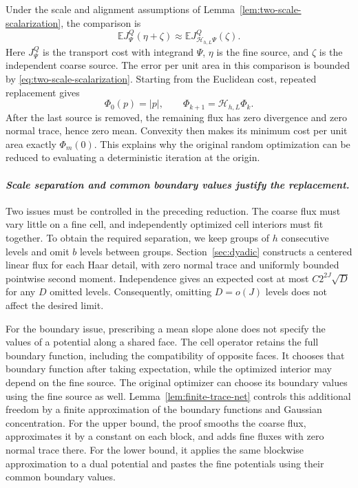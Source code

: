 \documentclass[11pt,reqno]{amsart}
\theoremstyle{plain}
\theoremstyle{definition}
\theoremstyle{remark}
\numberwithin{equation}{section}
\newcommand{\1}{\mathbf 1}
\begin{document}
Under the scale and alignment assumptions of
Lemma~\ref{lem:two-scale-scalarization}, the comparison is
\[
\mathbb E J_\Psi^Q(\eta+\zeta)
\approx\mathbb E J_{\mathcal H_{h,L}\Psi}^Q(\zeta).
\]
Here $J_\Psi^Q$ is the transport cost with integrand $\Psi$, $\eta$ is the
fine source, and $\zeta$ is the independent coarse source.  The error
per unit area in this comparison is bounded by
\eqref{eq:two-scale-scalarization}.
Starting from the Euclidean cost, repeated replacement gives
\[
\Phi_0(p)=|p|,\qquad \Phi_{k+1}=\mathcal H_{h,L}\Phi_k.
\]
After the last source is removed, the remaining flux has zero divergence
and zero normal trace, hence zero mean.  Convexity then makes its minimum
cost per unit area exactly $\Phi_m(0)$.  This explains why the original
random optimization can be reduced to evaluating a deterministic
iteration at the origin.

\smallskip
\paragraph{\textit{Scale separation and common boundary values justify the replacement.}}
Two issues must be controlled in the preceding reduction.  The coarse
flux must vary little on a fine cell, and independently optimized cell
interiors must fit together.  To obtain the required separation, we keep
groups of $h$ consecutive levels and omit $b$ levels between groups.
Section~\ref{sec:dyadic} constructs a centered linear flux for each Haar
detail, with zero normal trace and uniformly bounded pointwise second
moment.  Independence gives an expected cost at most
$C2^{2J}\sqrt D$ for any $D$ omitted levels.  Consequently, omitting
$D=o(J)$ levels does not affect the desired limit.

For the boundary issue, prescribing a mean slope alone does not specify
the values of a potential along a shared face.  The cell operator retains
the full boundary function, including the compatibility of opposite
faces.  It chooses that boundary function after taking expectation, while
the optimized interior may depend on the fine source.  The original
optimizer can choose its boundary values using the fine source as well.
Lemma~\ref{lem:finite-trace-net} controls this additional freedom by a
finite approximation of the boundary functions and Gaussian concentration.
For the upper bound, the proof smooths the coarse flux, approximates it
by a constant on each block, and adds fine fluxes with zero normal trace
there.  For the lower bound, it applies the same blockwise approximation
to a dual potential and pastes the fine potentials using their common
boundary values.
\end{document}
